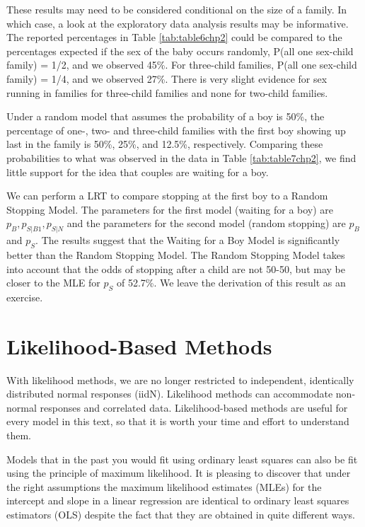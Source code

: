 \documentclass[
]{krantz}
\newcommand{\bstop}{p_{S|B1}}
\newcommand{\nstop}{p_{S|N}}
\begin{document}
These results may need to be considered conditional on the size of a family. In which case, a look at the exploratory data analysis results may be informative. The reported percentages in Table \ref{tab:table6chp2} could be compared to the percentages expected if the sex of the baby occurs randomly, P(all one sex-child family) = 1/2, and we observed 45\%. For three-child families, P(all one sex-child family) = 1/4, and we observed 27\%. There is very slight evidence for sex running in families for three-child families and none for two-child families.

Under a random model that assumes the probability of a boy is 50\%, the percentage of one-, two- and three-child families with the first boy showing up last in the family is 50\%, 25\%, and 12.5\%, respectively. Comparing these probabilities to what was observed in the data in Table \ref{tab:table7chp2}, we find little support for the idea that couples are waiting for a boy.

We can perform a LRT to compare stopping at the first boy to a Random Stopping Model. The parameters for the first model (waiting for a boy) are \(p_B, \bstop, \nstop\) and the parameters for the second model (random stopping) are \(p_B\) and \(p_S\). The results suggest that the Waiting for a Boy Model is significantly better than the Random Stopping Model. The Random Stopping Model takes into account that the odds of stopping after a child are not 50-50, but may be closer to the MLE for \(p_S\) of 52.7\%. We leave the derivation of this result as an exercise.

\hypertarget{likelihood-based-methods}{%
\section{Likelihood-Based Methods}\label{likelihood-based-methods}}

With likelihood methods, we are no longer restricted to independent, identically distributed normal responses (iidN). Likelihood methods can accommodate non-normal responses and correlated data. Likelihood-based methods are useful for every model in this text, so that it is worth your time and effort to understand them.

Models that in the past you would fit using ordinary least squares can also be fit using the principle of maximum likelihood. It is pleasing to discover that under the right assumptions the maximum likelihood estimates (MLEs) for the intercept and slope in a linear regression are identical to ordinary least squares estimators (OLS) despite the fact that they are obtained in quite different ways.
\end{document}
